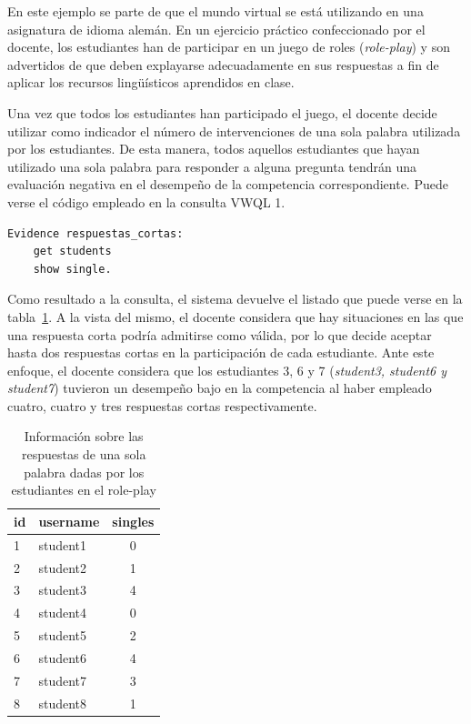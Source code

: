 
			En este ejemplo se parte de que el mundo virtual se está utilizando en una asignatura de idioma alemán. En un ejercicio práctico confeccionado por el docente, los estudiantes han de participar en un juego de roles (\emph{role-play}) y son advertidos de que deben explayarse adecuadamente en sus respuestas a fin de aplicar los recursos lingüísticos aprendidos en clase.

			Una vez que todos los estudiantes han participado el juego, el docente decide utilizar como indicador el número de intervenciones de una sola palabra utilizada por los estudiantes. De esta manera, todos aquellos estudiantes que hayan utilizado una sola palabra para responder a alguna pregunta tendrán una evaluación negativa en el desempeño de la competencia correspondiente. Puede verse el código empleado en la consulta VWQL 1.

\begin{verbatim}
Evidence respuestas_cortas:
    get students
    show single.
\end{verbatim}

			Como resultado a la consulta, el sistema devuelve el listado que puede verse en la tabla~\ref{tab:EvsListEj1}. A la vista del mismo, el docente considera que hay situaciones en las que una respuesta corta podría admitirse como válida, por lo que decide aceptar hasta dos respuestas cortas en la participación de cada estudiante. Ante este enfoque, el docente considera que los estudiantes 3, 6 y 7 (\emph{student3, student6 y student7}) tuvieron un desempeño bajo en la competencia al haber empleado cuatro, cuatro y tres respuestas cortas respectivamente.

\begin{table}
	\centering
	\caption{Información sobre las respuestas de una sola palabra dadas por los estudiantes en el role-play}
	\label{tab:EvsListEj1}
	\begin{tabular}{|l|l|c|}
		\hline
		id & username & singles \\
		\hline
		\hline
		1 & student1 & 0  \\
		\hline
		2 & student2 & 1  \\
		\hline
		3 & student3 & 4  \\
		\hline
		4 & student4 & 0  \\
		\hline
		5 & student5 & 2  \\
		\hline
		6 & student6 & 4  \\
		\hline
		7 & student7 & 3  \\
		\hline
		8 & student8 & 1  \\
		\hline
	\end{tabular}
\end{table}

